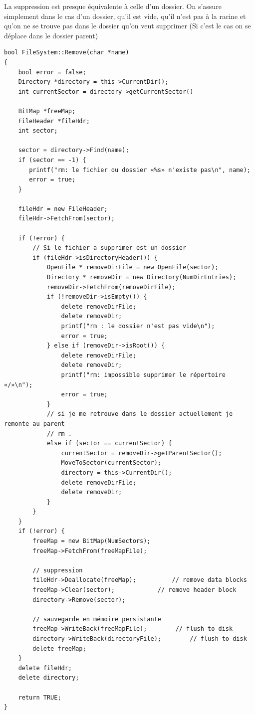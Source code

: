 \documentclass[a4paper,10pt]{article}
\begin{document}
La suppression est presque équivalente à celle d'un dossier. On s'assure
simplement dans le cas d'un dossier, qu'il est vide, qu'il n'est pas à la
racine et qu'on ne se trouve pas dans le dossier qu'on veut supprimer (Si
c'est le cas on se déplace dans le dossier parent)

\begin{lstlisting}
bool FileSystem::Remove(char *name)
{
    bool error = false;
    Directory *directory = this->CurrentDir();
    int currentSector = directory->getCurrentSector()

    BitMap *freeMap;
    FileHeader *fileHdr;
    int sector;

    sector = directory->Find(name);
    if (sector == -1) {
       printf("rm: le fichier ou dossier «%s» n'existe pas\n", name);
       error = true;
    }

    fileHdr = new FileHeader;
    fileHdr->FetchFrom(sector);

    if (!error) {
        // Si le fichier a supprimer est un dossier
        if (fileHdr->isDirectoryHeader()) {
            OpenFile * removeDirFile = new OpenFile(sector);
            Directory * removeDir = new Directory(NumDirEntries);
            removeDir->FetchFrom(removeDirFile);
            if (!removeDir->isEmpty()) {
                delete removeDirFile;
                delete removeDir;
                printf("rm : le dossier n'est pas vide\n");
                error = true;
            } else if (removeDir->isRoot()) {
                delete removeDirFile;
                delete removeDir;
                printf("rm: impossible supprimer le répertoire «/»\n");
                error = true;
            }
            // si je me retrouve dans le dossier actuellement je remonte au parent
            // rm .
            else if (sector == currentSector) {
                currentSector = removeDir->getParentSector();
                MoveToSector(currentSector);
                directory = this->CurrentDir();
                delete removeDirFile;
                delete removeDir;
            }
        }
    }
    if (!error) {
        freeMap = new BitMap(NumSectors);
        freeMap->FetchFrom(freeMapFile);

        // suppression
        fileHdr->Deallocate(freeMap);          // remove data blocks
        freeMap->Clear(sector);            // remove header block
        directory->Remove(sector);

        // sauvegarde en mémoire persistante
        freeMap->WriteBack(freeMapFile);        // flush to disk
        directory->WriteBack(directoryFile);        // flush to disk
        delete freeMap;
    }
    delete fileHdr;
    delete directory;

    return TRUE;
}

\end{lstlisting}
\end{document}
